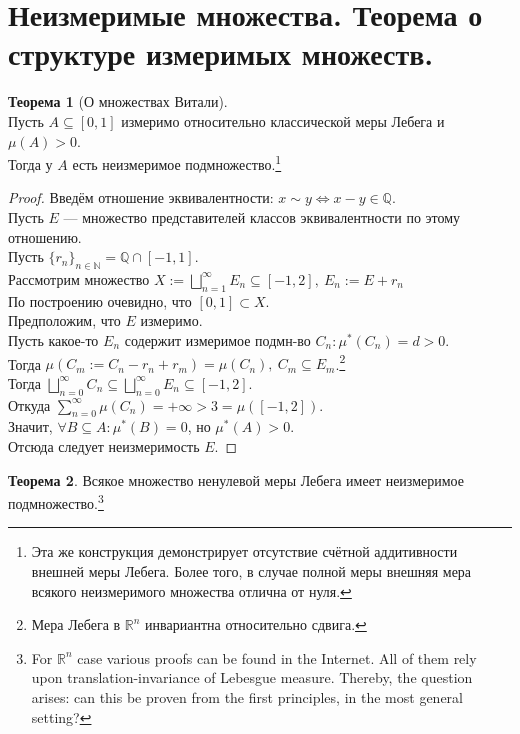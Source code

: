 \documentclass[11pt,a4paper]{report}
\def\Real{\mathbb{R}}
\def\Natural{\mathbb{N}}
\def\Rational{\mathbb{Q}}
\theoremstyle{definition}
\theoremstyle{definition}
\newtheorem{theorem}{Теорема}[section]
\theoremstyle{definition}
\begin{document}
	\section{Неизмеримые множества. Теорема о структуре измеримых множеств.}
	\begin{theorem}[О множествах Витали]$  $\\
		Пусть $ A \subseteq [0, 1] $ измеримо относительно классической меры Лебега и $ \mu(A) > 0 $.\\ 
		Тогда у $ A $ есть неизмеримое подмножество.\footnote{Эта же конструкция демонстрирует отсутствие счётной аддитивности внешней меры Лебега. Более того, в случае полной меры внешняя мера всякого неизмеримого множества отлична от нуля.}
	\end{theorem}
	\begin{proof}
		Введём отношение эквивалентности: $ x \sim y \iff x - y \in \Rational $.\\
		Пусть $ E $ — множество представителей классов эквивалентности по этому отношению.\\
		Пусть $ \{r_{n}\}_{n \in \Natural} = \Rational \cap [-1, 1] $.\\ 
		Рассмотрим множество $ X := \bigsqcup\limits_{n=1}^{\infty} E_{n} \subseteq [-1, 2],\ E_{n} := E + r_{n} $\\
		По построению очевидно, что $ [0, 1] \subset X $.\\
		Предположим, что $ E $ измеримо.\\ 
		Пусть какое-то $ E_{n} $ содержит измеримое подмн-во $ C_{n}: \mu^{*}(C_{n}) = d > 0 $.\\
		Тогда $ \mu(C_{m} := C_{n} - r_{n} + r_{m}) = \mu(C_{n}),\ C_{m} \subseteq E_{m} $.\footnote{Мера Лебега в $ \Real^{n} $ инвариантна относительно сдвига.}\\
		Тогда $ \bigsqcup\limits_{n=0}^{\infty} C_{n} \subseteq \bigsqcup\limits_{n=0}^{\infty} E_{n} \subseteq [-1, 2] $.\\
		Откуда $ \sum\limits_{n=0}^{\infty} \mu(C_{n}) = +\infty > 3 = \mu([-1, 2]) $.\\
		Значит, $ \forall B \subseteq A: \mu^{*}(B) = 0 $, но $ \mu^{*}(A) > 0 $.\\
		Отсюда следует неизмеримость $ E $.
	\end{proof}
	\begin{theorem}
		Всякое множество ненулевой меры Лебега имеет неизмеримое подмножество.\footnote{For $ \Real^{n} $ case various proofs can be found in the Internet. All of them rely upon translation-invariance of Lebesgue measure. Thereby, the question arises: can this be proven from the first principles, in the most general setting?}
	\end{theorem}
\end{document}
